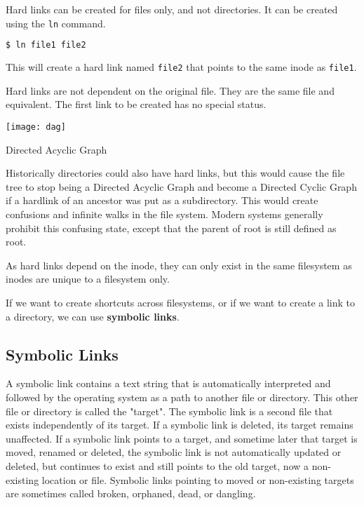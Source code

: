 Hard links can be created for files only, and not directories.
It can be created using the \texttt{ln} command.

\begin{lstlisting}[language=bash]
$ ln file1 file2
\end{lstlisting}

This will create a hard link named \texttt{file2} that points to the same inode as \texttt{file1}.

\begin{remark}
  Hard links are not dependent on the original file.
  They are the same file and equivalent.
  The first link to be created has no special status.
\end{remark}

\begin{marginfigure}
  \texttt{[image: dag]}
  \caption[Directed Acyclic Graph]{Directed Acyclic Graph}
\end{marginfigure}

Historically directories could also have hard links, but this would cause the file tree to stop being a Directed Acyclic Graph
and become a Directed Cyclic Graph if a hardlink of an ancestor was put as a subdirectory.
This would create confusions and infinite walks in the file system.
Modern systems generally prohibit this confusing state, except that the parent of root is still defined as root.

As hard links depend on the inode, they can only exist in the same filesystem as inodes are unique to a filesystem only.

If we want to create shortcuts across filesystems, or if we want to create a link to a directory, we can use \textbf{symbolic links}.

\subsection{Symbolic Links}

A symbolic link contains a text string that is automatically interpreted and followed by the operating system as a path to another file or directory.
This other file or directory is called the "target".
The symbolic link is a second file that exists independently of its target.
If a symbolic link is deleted, its target remains unaffected.
If a symbolic link points to a target, and sometime later that target is moved, renamed or deleted, the symbolic link is not automatically updated or deleted, but continues to exist and still points to the old target, now a non-existing location or file.
Symbolic links pointing to moved or non-existing targets are sometimes called broken, orphaned, dead, or dangling.

